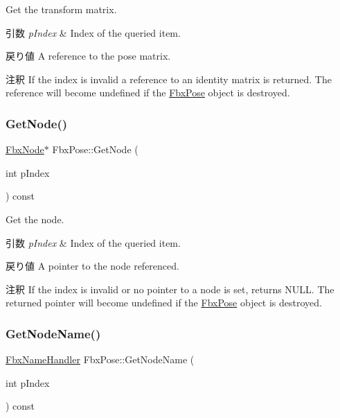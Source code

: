 Get the transform matrix. 
\begin{DoxyParams}{引数}
{\em p\+Index} & Index of the queried item. \\
\hline
\end{DoxyParams}
\begin{DoxyReturn}{戻り値}
A reference to the pose matrix. 
\end{DoxyReturn}
\begin{DoxyRemark}{注釈}
If the index is invalid a reference to an identity matrix is returned. The reference will become undefined if the \hyperlink{class_fbx_pose}{Fbx\+Pose} object is destroyed. 
\end{DoxyRemark}
\mbox{\label{class_fbx_pose_a17056687b9315b92c04483ab298702bd}} 
\subsubsection{\texorpdfstring{Get\+Node()}{GetNode()}}
{\footnotesize\ttfamily \hyperlink{class_fbx_node}{Fbx\+Node}$\ast$ Fbx\+Pose\+::\+Get\+Node (\begin{DoxyParamCaption}\item[{int}]{p\+Index }\end{DoxyParamCaption}) const}

Get the node. 
\begin{DoxyParams}{引数}
{\em p\+Index} & Index of the queried item. \\
\hline
\end{DoxyParams}
\begin{DoxyReturn}{戻り値}
A pointer to the node referenced. 
\end{DoxyReturn}
\begin{DoxyRemark}{注釈}
If the index is invalid or no pointer to a node is set, returns N\+U\+LL. The returned pointer will become undefined if the \hyperlink{class_fbx_pose}{Fbx\+Pose} object is destroyed. 
\end{DoxyRemark}
\mbox{\label{class_fbx_pose_a9a6ce2c4c29248df156ca86bacdb905c}} 
\subsubsection{\texorpdfstring{Get\+Node\+Name()}{GetNodeName()}}
{\footnotesize\ttfamily \hyperlink{class_fbx_name_handler}{Fbx\+Name\+Handler} Fbx\+Pose\+::\+Get\+Node\+Name (\begin{DoxyParamCaption}\item[{int}]{p\+Index }\end{DoxyParamCaption}) const}

